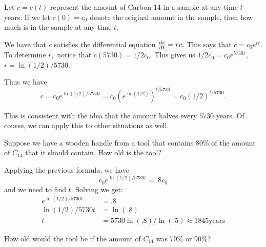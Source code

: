\begin{myexample}
Let $c=c(t)$ represent the amount of Carbon-14 in a sample at any time
$t$ years.  If we let $c(0)=c_0$ denote the original amount in the
sample, then how much is in the sample at any time $t.$ 

 We have that $c$ satisfies the
differential equation $\frac{\text{d}{c}}{\text{d}{t}}=rc.$  This says that $c=c_0e^{rt}.$
To determine $r,$ notice that $c(5730)=1/2 c_0.$  This gives us 
$1/2c_0=c_0 e^{5730r},$ $r=\ln(1/2)/5730.$

Thus we have
$$
c=c_0 e^{\ln(1/2)/5730 t}=c_0 \left(e^{\ln(1/2)}\right)^{t/5730}=c_0
(1/2)^{t/5730}.
$$

This is consistent with the idea that the amount halves every $5730$
years.  Of course, we can apply this to other situations as well. 
  
\end{myexample}

\begin{myexample}
  Suppose we have a wooden handle from a tool that contains 80\% of
  the amount of $C_{14}$ that it should contain.  How old is the tool?

  Applying the previous formula, we have
$$
c_0 e^{\ln(1/2)/5730 t}=.8c_0
$$
and we need to find $t.$  Solving we get:
\begin{align*}
  e^{\ln(1/2)/5730 t}&=.8\\
  \ln(1/2)/5730 t&=\ln(.8)\\
  t&=5730\ln(.8)/\ln(.5) \approx 1845 \text{years}
\end{align*}

\begin{embeddedproblem}{}
  How old would the tool be if the amount of $C_{14}$ was 70\% or 90\%?
\end{embeddedproblem}


\end{myexample}


